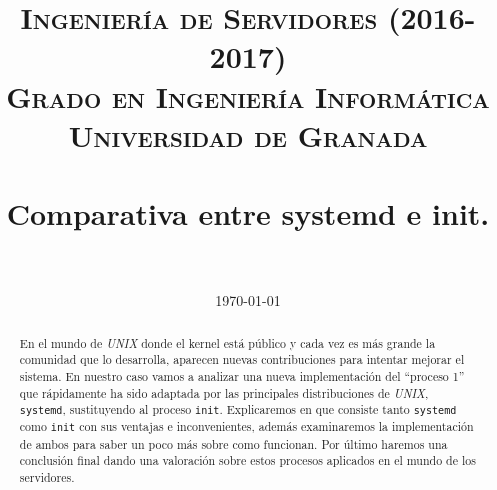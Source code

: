


\title{	
\normalfont \normalsize 
\textsc{\textbf{Ingeniería de Servidores (2016-2017)} \\ Grado en Ingeniería Informática \\ Universidad de Granada} \\ [25pt] %
\horrule{0.5pt} \\[0.4cm] %
\huge Comparativa entre systemd e init. \\ %
\horrule{2pt} \\[0.5cm] %
}

\date{\normalsize\today} %




\maketitle %

\newpage

\begin{abstract}

En el mundo de \textit{UNIX} donde el kernel está público y cada vez es más grande la comunidad que lo desarrolla, aparecen nuevas contribuciones para intentar mejorar el sistema. En nuestro caso vamos a analizar una nueva implementación del ``proceso 1'' que rápidamente ha sido adaptada por las principales distribuciones de \textit{UNIX}, \texttt{systemd}, sustituyendo al proceso \texttt{init}. Explicaremos en que consiste tanto \texttt{systemd} como \texttt{init} con sus ventajas e inconvenientes, además examinaremos la implementación de ambos para saber un poco más sobre como funcionan. Por último haremos una conclusión final dando una valoración sobre estos procesos aplicados en el mundo de los servidores.



\end{abstract}

